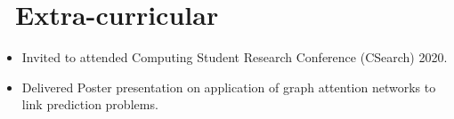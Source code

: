 \documentclass{resume}
\begin{document}
\section{\faInfo\ Extra-curricular}
\begin{itemize}
	\item Invited to attended Computing Student Research Conference (CSearch) 2020.
	\item Delivered Poster presentation on application of graph attention networks to link prediction problems.
\end{itemize}
%
%
\end{document}
